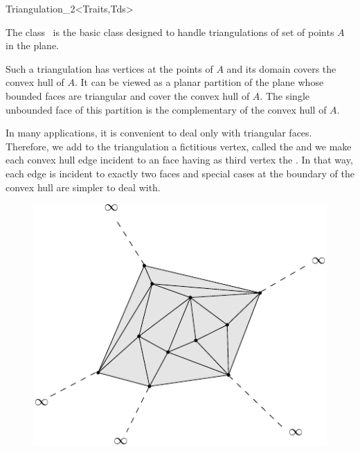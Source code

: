 

\ccModifierCrossRefOff
\begin{ccRefClass}{Triangulation_2<Traits,Tds>}  %


\ccDefinition
  
The class \ccRefName\ is the basic class 
designed to handle triangulations
of set of points ${  A}$ in the plane.

Such a triangulation has vertices at the points of ${  A}$
and its domain covers the convex hull of ${  A}$.
It can be viewed as a planar partition of the plane
whose bounded faces are triangular and cover
the convex hull of ${  A}$. The single unbounded face of this partition
is the complementary of the convex hull of ${  A}$.
 
In many applications, it is convenient to
deal only with triangular faces. Therefore, we add to the
triangulation
a fictitious vertex, called the 
and we make each  convex hull edge incident 
to an  
face having as third vertex  the .
 In that way, each edge is incident to exactly two faces
and special cases at the
boundary of the convex hull are simpler to deal with.

\begin{figure}[h]
\begin{ccTexOnly}
\begin{center} \includegraphics[scale=0.5]{Triangulation_2_ref/infinite_vertex} \end{center}
\end{ccTexOnly}


\end{figure}
\end{ccRefClass}
